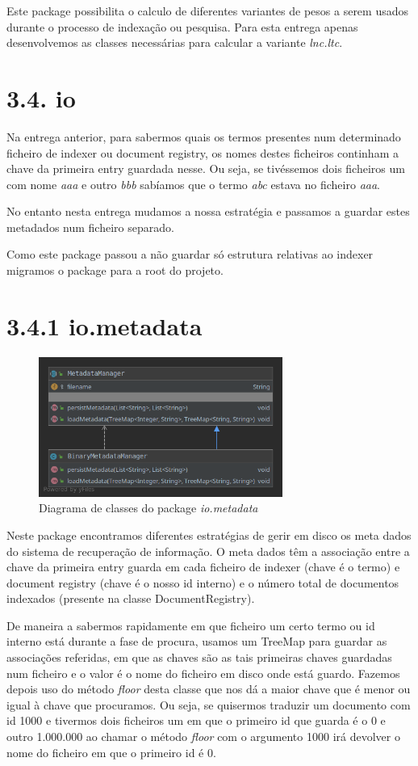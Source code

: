 \documentclass[12pt]{article}
\begin{document}
Este package possibilita o calculo de diferentes variantes de pesos a
serem usados durante o processo de indexação ou pesquisa.
Para esta entrega apenas desenvolvemos as classes necessárias para
calcular a variante {\it lnc.ltc}.

\section*{3.4. io}

Na entrega anterior, para sabermos quais os termos presentes num
determinado ficheiro de indexer ou document registry, os nomes destes
ficheiros continham a chave da primeira entry guardada nesse.
Ou seja, se tivéssemos dois ficheiros um com nome {\it aaa} e outro
{\it bbb} sabíamos que o termo {\it abc} estava no ficheiro {\it
aaa}.

No entanto nesta entrega mudamos a nossa estratégia e passamos a
guardar estes metadados num ficheiro separado.

Como este package passou a não guardar só estrutura relativas ao
indexer migramos o package para a root do projeto.

\section*{3.4.1 io.metadata}
\begin{figure}[H]
  \center
   \includegraphics[width=8cm]{packages_io_metadata.png}
  \caption{Diagrama de classes do package \it
    io.metadata}
\end{figure}

Neste package encontramos diferentes estratégias de gerir em disco os
meta dados do sistema de recuperação de informação.
O meta dados têm a associação entre a chave da primeira entry guarda
em cada ficheiro de indexer (chave é o termo) e document registry
(chave é o nosso id interno) e o número total de documentos indexados
(presente na classe DocumentRegistry).

De maneira a sabermos rapidamente em que ficheiro um certo termo ou
id interno está durante a fase de procura, usamos um TreeMap para
guardar as associações referidas, em que as chaves são as tais
primeiras chaves guardadas num ficheiro e o valor é o nome do
ficheiro em disco onde está guardo.
Fazemos depois uso do método {\it floor} desta classe que nos dá a
maior chave que é menor ou igual à chave que procuramos.
Ou seja, se quisermos traduzir um documento com id 1000 e tivermos
dois ficheiros um em que o primeiro id que guarda é o 0 e outro
1.000.000 ao chamar o método {\it floor} com o argumento 1000 irá
devolver o nome do ficheiro em que o primeiro id é 0.
\end{document}
